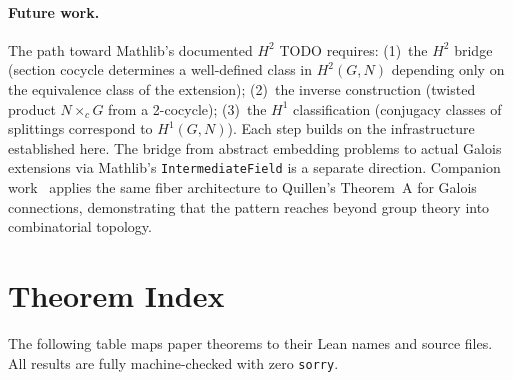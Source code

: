 \documentclass[11pt]{article}
\newcommand{\lean}[1]{\texttt{#1}}
\begin{document}
\paragraph{Future work.}
The path toward Mathlib's documented $H^2$ TODO requires: (1)~the $H^2$ bridge
(section cocycle determines a well-defined class in $H^2(G, N)$ depending only on
the equivalence class of the extension); (2)~the inverse construction (twisted
product $N \times_c G$ from a 2-cocycle); (3)~the $H^1$ classification
(conjugacy classes of splittings correspond to $H^1(G, N)$). Each step builds on
the infrastructure established here. The bridge from abstract embedding problems
to actual Galois extensions via Mathlib's \lean{IntermediateField} is a separate
direction. Companion work~\cite{SpivackQuillen} applies the same fiber
architecture to Quillen's Theorem~A for Galois connections, demonstrating that the
pattern reaches beyond group theory into combinatorial topology.

\appendix
\section{Theorem Index}\label{app:index}

The following table maps paper theorems to their Lean names and source files.
All results are fully machine-checked with zero \lean{sorry}.
\end{document}
